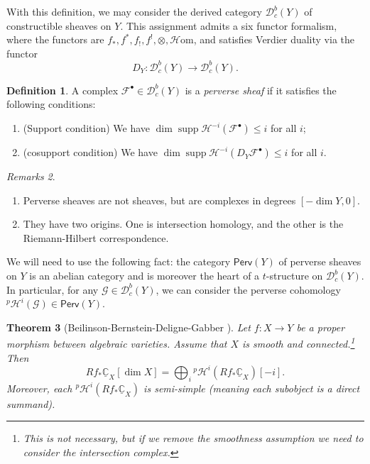 \documentclass{amsart}
\newtheorem{thm}{Theorem}[section]
\theoremstyle{definition}
\newtheorem{defn}[thm]{Definition}
\theoremstyle{remark}
\newtheorem{rmks}[thm]{Remarks}
\theoremstyle{plain}
\theoremstyle{definition}
\theoremstyle{remark}
\newcommand{\C}{\mathbb{C}}
\newcommand{\mc}[1]{\mathcal{#1}}
\newcommand{\mr}[1]{\mathrm{#1}}
\newcommand{\on}[1]{\operatorname{#1}}
\newcommand{\ms}[1]{\mathsf{#1}}
\newcommand{\ul}[1]{\underline{#1}}
\newcommand{\1}{\mathbf{1}}
\newcommand{\2}{\mathbf{2}}
\newcommand{\3}{\mathbf{3}}
\begin{document}
With this definition, we may consider the derived category \(\mc{D}_c^b(Y)\) of constructible sheaves on \(Y\). This assignment admits a six functor formalism, where the functors are \(f_*, f^*, f_!, f^!, \otimes, \mc{H}\mr{om}\), and satisfies Verdier duality via the functor
\[ D_Y \colon \mc{D}_c^b(Y) \to \mc{D}_c^b(Y). \]

\begin{defn}
    A complex \(\mc{F}^{\bullet} \in \mc{D}_c^b(Y)\) is a \textit{perverse sheaf} if it satisfies the following conditions:
    \begin{enumerate}
        \item (Support condition) We have \(\dim \on{supp} \mc{H}^{-i}(\mc{F}^{\bullet}) \leq i\) for all \(i\);
        \item (cosupport condition) We have \(\dim \on{supp} \mc{H}^{-i}(D_Y \mc{F}^{\bullet}) \leq i\) for all \(i\).
    \end{enumerate}
\end{defn}

\begin{rmks}\leavevmode
    \begin{enumerate}
        \item Perverse sheaves are not sheaves, but are complexes in degrees \([-\dim Y, 0]\).
        \item They have two origins. One is intersection homology, and the other is the Riemann-Hilbert correspondence.
    \end{enumerate}
\end{rmks}

We will need to use the following fact: the category \(\ms{Perv}(Y)\) of perverse sheaves on \(Y\) is an abelian category and is moreover the heart of a \(t\)-structure on \(\mc{D}_c^b(Y)\). In particular, for any \(\mc{G} \in \mc{D}_c^b (Y)\), we can consider the perverse cohomology \(^p\mc{H}^i(\mc{G}) \in \ms{Perv}(Y)\).

\begin{thm}[Beilinson-Bernstein-Deligne-Gabber {\cite{BBD1982}}]
    Let \(f \colon X \to Y\) be a proper morphism between algebraic varieties. Assume that \(X\) is smooth and connected.\footnote{This is not necessary, but if we remove the smoothness assumption we need to consider the intersection complex.} Then
    \[ R f_* \ul{\C}_X [\dim X] = \bigoplus_{i} {^p\mc{H}^i}(R f_* \ul{\C}_X)[-i]. \]
    Moreover, each \(^p\mc{H}^i (R f_* \ul{\C}_X)\) is semi-simple (meaning each subobject is a direct summand).
\end{thm}
\end{document}
